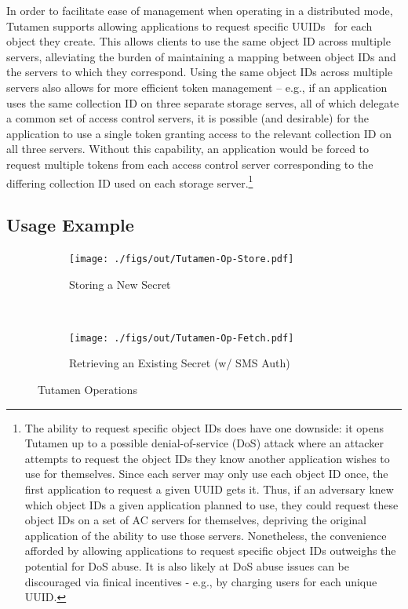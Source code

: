 In order to facilitate ease of management when operating in a
distributed mode, Tutamen supports allowing applications to request
specific UUIDs~\cite{leach2005} for each object they create. This
allows clients to use the same object ID across multiple servers,
alleviating the burden of maintaining a mapping between object IDs and
the servers to which they correspond. Using the same object IDs across
multiple servers also allows for more efficient token management --
e.g., if an application uses the same collection ID on three separate
storage serves, all of which delegate a common set of access control
servers, it is possible (and desirable) for the application to use a
single token granting access to the relevant collection ID on all
three servers. Without this capability, an application would be forced
to request multiple tokens from each access control server
corresponding to the differing collection ID used on each storage
server.\footnote{The ability to request specific object IDs does have
  one downside: it opens Tutamen up to a possible denial-of-service
  (DoS) attack where an attacker attempts to request the object IDs
  they know another application wishes to use for themselves. Since
  each server may only use each object ID once, the first application
  to request a given UUID gets it. Thus, if an adversary knew which
  object IDs a given application planned to use, they could request
  these object IDs on a set of AC servers for themselves, depriving
  the original application of the ability to use those
  servers. Nonetheless, the convenience afforded by allowing
  applications to request specific object IDs outweighs the potential
  for DoS abuse. It is also likely at DoS abuse issues can be
  discouraged via finical incentives - e.g., by charging users for
  each unique UUID.}

\subsection{Usage Example}
\label{chap:tutamen:arch:example}

\begin{figure}[!t]
  \centering
  \begin{subfigure}[t]{0.48\textwidth}
    \texttt{[image: ./figs/out/Tutamen-Op-Store.pdf]}
    \caption{Storing a New Secret}
    \label{fig:tutamen:ops:store}
  \end{subfigure}
  ~
  \begin{subfigure}[t]{0.48\textwidth}
    \texttt{[image: ./figs/out/Tutamen-Op-Fetch.pdf]}
    \caption{Retrieving an Existing Secret (w/ SMS Auth)}
    \label{fig:tutamen:ops:fetch}
  \end{subfigure}
  \caption{Tutamen Operations}
  \label{fig:tutamen:ops}
\end{figure}

